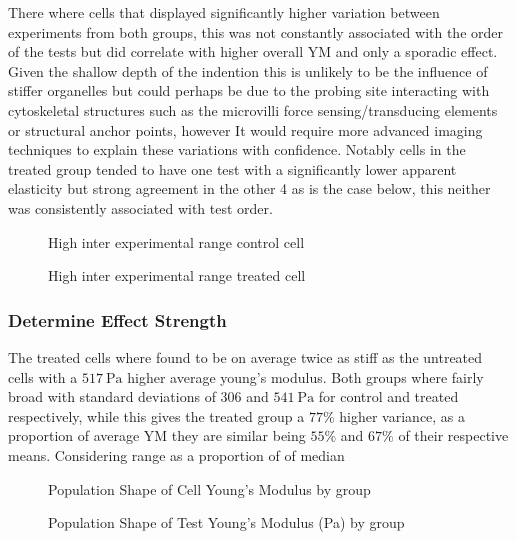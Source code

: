 \documentclass[
  paper=a4,
  ,captions=tableheading
]{scrartcl}
\makeatletter
\newcommand*\pandocbounded[1]{%
  \sbox\pandoc@box{#1}%
  \Gscale@div\@tempa{\textheight}{\dimexpr\ht\pandoc@box+\dp\pandoc@box\relax}%
  \Gscale@div\@tempb{\linewidth}{\wd\pandoc@box}%
  \ifdim\@tempb\p@<\@tempa\p@\let\@tempa\@tempb\fi%
  \ifdim\@tempa\p@<\p@\scalebox{\@tempa}{\usebox\pandoc@box}%
  \else\usebox{\pandoc@box}%
  \fi%
}
\makeatother
\begin{document}
There where cells that displayed significantly higher variation between
experiments from both groups, this was not constantly associated with
the order of the tests but did correlate with higher overall YM and only
a sporadic effect. Given the shallow depth of the indention this is
unlikely to be the influence of stiffer organelles but could perhaps be
due to the probing site interacting with cytoskeletal structures such as
the microvilli force sensing/transducing elements or structural anchor
points, however It would require more advanced imaging techniques to
explain these variations with confidence. Notably cells in the treated
group tended to have one test with a significantly lower apparent
elasticity but strong agreement in the other 4 as is the case below,
this neither was consistently associated with test order.

\noindent
\begin{minipage}[t]{0.48\textwidth}
\begin{figure}
\centering
\pandocbounded{}
\caption{High inter experimental range control cell}
\end{figure}
\end{minipage}
\hfill
\begin{minipage}[t]{0.48\textwidth}
\begin{figure}
\centering
\pandocbounded{}
\caption{High inter experimental range treated cell}
\end{figure}
\end{minipage}

\subsubsection{Determine Effect
Strength}\label{determine-effect-strength}

The treated cells where found to be on average twice as stiff as the
untreated cells with a \(517 \ \text{Pa}\) higher average young's
modulus. Both groups where fairly broad with standard deviations of
\(306\) and \(541 \ \text{Pa}\) for control and treated respectively,
while this gives the treated group a \(77\%\) higher variance, as a
proportion of average YM they are similar being \(55\%\) and \(67\%\) of
their respective means. Considering range as a proportion of of median

\noindent
\begin{minipage}[t]{0.48\textwidth}
\begin{figure}
\centering
\pandocbounded{}
\caption{Population Shape of Cell Young's Modulus by group}
\end{figure}
\end{minipage}
\hfill
\begin{minipage}[t]{0.48\textwidth}
\begin{figure}
\centering
\pandocbounded{}
\caption{Population Shape of Test Young's Modulus (Pa) by group}
\end{figure}
\end{minipage}
\end{document}

